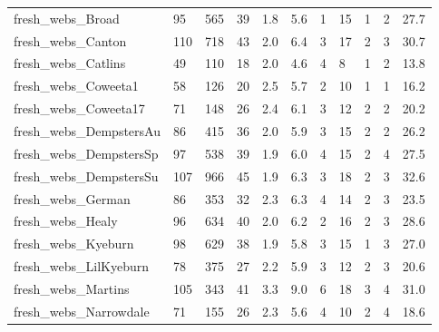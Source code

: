 \begin{longtable}{lllllllllll}
 fresh\_webs\_Broad                                   & 95         & 565       & 39    & 1.8    & 5.6    & 1     & 15     & 1      & 2      & 27.7    \\
 fresh\_webs\_Canton                                  & 110        & 718       & 43    & 2.0    & 6.4    & 3     & 17     & 2      & 3      & 30.7    \\
 fresh\_webs\_Catlins                                 & 49         & 110       & 18    & 2.0    & 4.6    & 4     & 8      & 1      & 2      & 13.8    \\
 fresh\_webs\_Coweeta1                                & 58         & 126       & 20    & 2.5    & 5.7    & 2     & 10     & 1      & 1      & 16.2    \\
 fresh\_webs\_Coweeta17                               & 71         & 148       & 26    & 2.4    & 6.1    & 3     & 12     & 2      & 2      & 20.2    \\
 fresh\_webs\_DempstersAu                             & 86         & 415       & 36    & 2.0    & 5.9    & 3     & 15     & 2      & 2      & 26.2    \\
 fresh\_webs\_DempstersSp                             & 97         & 538       & 39    & 1.9    & 6.0    & 4     & 15     & 2      & 4      & 27.5    \\
 fresh\_webs\_DempstersSu                             & 107        & 966       & 45    & 1.9    & 6.3    & 3     & 18     & 2      & 3      & 32.6    \\
 fresh\_webs\_German                                  & 86         & 353       & 32    & 2.3    & 6.3    & 4     & 14     & 2      & 3      & 23.5    \\
 fresh\_webs\_Healy                                   & 96         & 634       & 40    & 2.0    & 6.2    & 2     & 16     & 2      & 3      & 28.6    \\
 fresh\_webs\_Kyeburn                                 & 98         & 629       & 38    & 1.9    & 5.8    & 3     & 15     & 1      & 3      & 27.0    \\
 fresh\_webs\_LilKyeburn                              & 78         & 375       & 27    & 2.2    & 5.9    & 3     & 12     & 2      & 3      & 20.6    \\
 fresh\_webs\_Martins                                 & 105        & 343       & 41    & 3.3    & 9.0    & 6     & 18     & 3      & 4      & 31.0    \\
 fresh\_webs\_Narrowdale                              & 71         & 155       & 26    & 2.3    & 5.6    & 4     & 10     & 2      & 4      & 18.6    \\

\end{longtable}
